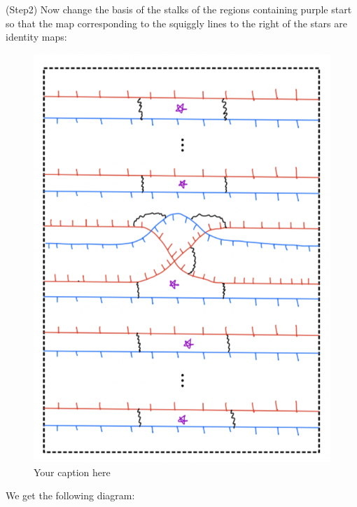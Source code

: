 (Step2) Now change the basis of the stalks of the regions containing purple start so that the map corresponding to the squiggly lines to the right of the stars are identity maps:
\begin{figure}[H] %
    \centering
    \includegraphics[width=\linewidth]{diagrams/theorem12/5.png} %
    \caption{Your caption here}
    \label{fig:your-label}
\end{figure}

We get the following diagram:

